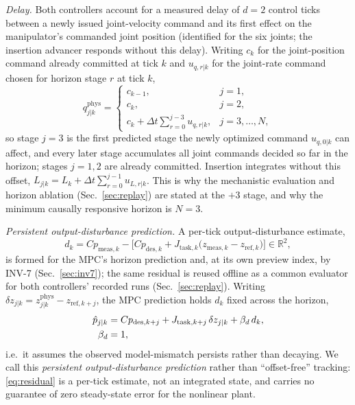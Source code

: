 \documentclass[journal]{IEEEtran}
\begin{document}
\emph{Delay.} Both controllers account for a measured delay of $d=2$
control ticks between a newly issued joint-velocity command and its first
effect on the manipulator's commanded joint position (identified for the
six joints; the insertion advancer responds without this delay). Writing
$c_{k}$ for the joint-position command already committed at tick $k$ and
$u_{q,r|k}$ for the joint-rate command chosen for horizon stage $r$ at
tick $k$,
\begin{equation}
q^{\mathrm{phys}}_{j|k} =
\begin{cases}
c_{k-1}, & j=1,\\
c_{k}, & j=2,\\[2pt]
\displaystyle c_{k} + \Delta t\sum_{r=0}^{j-3}u_{q,r|k}, & j=3,\dots,N,
\end{cases}
\label{eq:delay-stages}
\end{equation}
so stage $j{=}3$ is the first predicted stage the newly optimized command
$u_{q,0|k}$ can affect, and every later stage accumulates all joint
commands decided so far in the horizon; stages $j{=}1,2$ are already
committed. Insertion integrates without this offset,
$L_{j|k}=L_k+\Delta t\sum_{r=0}^{j-1}u_{L,r|k}$. This is why the
mechanistic evaluation and horizon ablation (Sec.~\ref{sec:replay}) are
stated at the $+3$ stage, and why the minimum causally responsive horizon
is $N=3$.

\emph{Persistent output-disturbance prediction.} A per-tick
output-disturbance estimate,
\begin{equation}
d_k = C p_{\mathrm{meas},k} -
\Big[C p_{\mathrm{des},k} +
J_{\mathrm{task},k}\big(z_{\mathrm{meas},k}-z_{\mathrm{ref},k}\big)\Big]
\in\mathbb{R}^2,
\label{eq:residual}
\end{equation}
is formed for the MPC's horizon prediction and, at its own preview index,
by INV-7 (Sec.~\ref{sec:inv7}); the same residual is reused offline as a
common evaluator for both controllers' recorded runs
(Sec.~\ref{sec:replay}). Writing $\delta z_{j|k}=z^{\mathrm{phys}}_{j|k}-z_{\mathrm{ref},k+j}$,
the MPC prediction holds $d_k$ fixed across the horizon,
\begin{align}
\hat p_{j|k} &= C p_{\mathrm{des},k+j}
+ J_{\mathrm{task},k+j}\,\delta z_{j|k}
+ \beta_d\,d_k,
\label{eq:disturbance-prediction}\\
\beta_d &= 1,\notag
\end{align}
i.e.\ it assumes the observed model-mismatch persists rather than
decaying. We call this \emph{persistent output-disturbance prediction}
rather than ``offset-free'' tracking: \eqref{eq:residual} is a per-tick
estimate, not an integrated state, and carries no guarantee of zero
steady-state error for the nonlinear plant.
\end{document}
